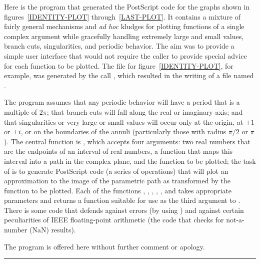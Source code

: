 \begin{new}

Here is the program that generated the PostScript code for
the graphs shown in figures~\ref{IDENTITY-PLOT} through~\ref{LAST-PLOT}.
It contains a mixture of fairly general mechanisms and \emph{ad hoc} kludges
for plotting functions of a single complex argument while gracefully handling
extremely large and small values,
branch cuts, singularities, and periodic behavior.
The aim was to provide a simple user interface that would not
require the caller to provide special advice for each function
to be plotted.
The file for figure~\ref{IDENTITY-PLOT}, for example, was generated
by the call , which resulted in the writing of
a file named .

The program assumes that any periodic behavior will have a period that is a multiple of
$2\pi$; that branch cuts will fall along the real or imaginary axis;
and that singularities or very large or small values
will occur only at the origin, at $\pm 1$ or $\pm \emph{i}$,
or on the boundaries of the annuli (particularly those with radius $\pi/2$ or $\pi$).
The central function is , which accepts four arguments:
two real numbers that are the endpoints of an interval of real numbers,
a function that maps this interval into a path in the complex plane,
and the function to be plotted; the task of  is to
generate PostScript code (a series of  operations)
that will plot an approximation to the image of the parametric path
as transformed by the function to be plotted.
Each of the functions , , , , ,
and  takes appropriate parameters
and returns a function suitable for use as the third argument
to .
There is some code that defends against errors
(by using ) and against certain peculiarities of
IEEE floating-point arithmetic (the code that checks for not-a-number (NaN) results).

The program is offered here without further comment or apology.

\hrule width 0pt\relax


\end{new}
